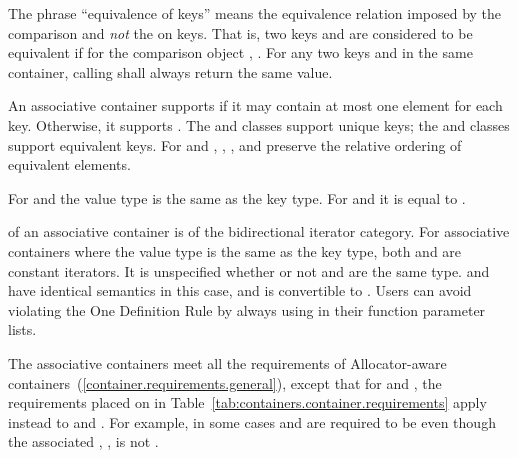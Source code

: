 \pnum
The phrase ``equivalence of keys'' means the equivalence relation imposed by the
comparison and
\textit{not}
the
on keys.
That is, two keys
and
are considered to be equivalent if for the
comparison object
,
.
For any two keys
and
in the same container, calling
shall always return the same value.

\pnum
An associative container supports  if it may contain at
most one element for each key. Otherwise, it supports .
The  and  classes support unique keys; the 
and  classes support equivalent keys.
For  and ,
, , and  preserve the relative ordering
of equivalent elements.

\pnum
For  and  the value type is the same as the key type.
For  and  it is equal to .

\pnum
{}
of an associative container is of the bidirectional iterator category.
For associative containers where the value type is the same as the key type, both
and
are constant iterators. It is unspecified whether or not
and
are the same type.
\enternote {} and  have identical semantics in this case, and  is convertible to . Users can avoid violating the One Definition Rule by always using  in their function parameter lists. \exitnote

\pnum
The associative containers meet all the requirements of Allocator-aware
containers~(\ref{container.requirements.general}), except that for
 and , the requirements placed on 
in Table~\ref{tab:containers.container.requirements} apply instead to 
and . \enternote For example, in some cases  and 
are required to be  even though the associated
, , is not
. \exitnote

